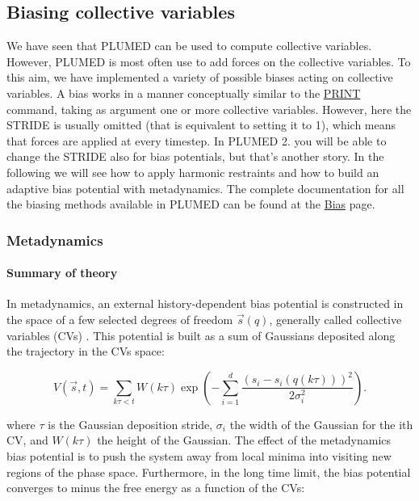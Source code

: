 \hypertarget{munster_munster-biasing}{}\subsection{Biasing collective variables}\label{munster_munster-biasing}
We have seen that P\+L\+U\+M\+E\+D can be used to compute collective variables. However, P\+L\+U\+M\+E\+D is most often use to add forces on the collective variables. To this aim, we have implemented a variety of possible biases acting on collective variables. A bias works in a manner conceptually similar to the \hyperlink{PRINT}{P\+R\+I\+N\+T} command, taking as argument one or more collective variables. However, here the S\+T\+R\+I\+D\+E is usually omitted (that is equivalent to setting it to 1), which means that forces are applied at every timestep. In P\+L\+U\+M\+E\+D 2. you will be able to change the S\+T\+R\+I\+D\+E also for bias potentials, but that's another story. In the following we will see how to apply harmonic restraints and how to build an adaptive bias potential with metadynamics. The complete documentation for all the biasing methods available in P\+L\+U\+M\+E\+D can be found at the \hyperlink{_bias}{Bias} page.\hypertarget{munster_munster-biasing-me}{}\subsubsection{Metadynamics}\label{munster_munster-biasing-me}
 \hypertarget{munster_munster-biasing-me-theory}{}\paragraph{Summary of theory}\label{munster_munster-biasing-me-theory}
In metadynamics, an external history-\/dependent bias potential is constructed in the space of a few selected degrees of freedom $ \vec{s}({q}) $, generally called collective variables (C\+Vs) \cite{metad}. This potential is built as a sum of Gaussians deposited along the trajectory in the C\+Vs space\+:

\[ V(\vec{s},t) = \sum_{ k \tau < t} W(k \tau) \exp\left( -\sum_{i=1}^{d} \frac{(s_i-s_i({q}(k \tau)))^2}{2\sigma_i^2} \right). \]

where $ \tau $ is the Gaussian deposition stride, $ \sigma_i $ the width of the Gaussian for the ith C\+V, and $ W(k \tau) $ the height of the Gaussian. The effect of the metadynamics bias potential is to push the system away from local minima into visiting new regions of the phase space. Furthermore, in the long time limit, the bias potential converges to minus the free energy as a function of the C\+Vs\+:

